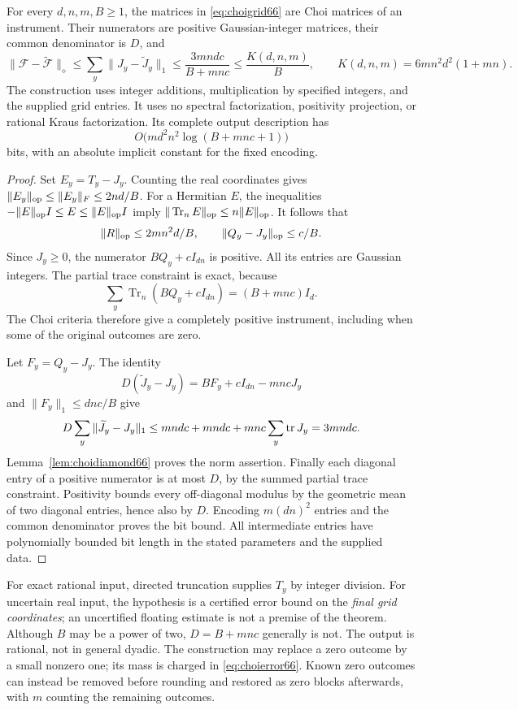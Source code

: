 \begin{theorem}\label{thm:choiround66}
For every $d,n,m,B\ge1$, the matrices in \eqref{eq:choigrid66} are
Choi matrices of an instrument. Their numerators are positive
Gaussian-integer matrices, their common denominator is $D$, and
\begin{equation}\label{eq:choierror66}
 \|\mathcal F-\widetilde{\mathcal F}\|_\diamond
 \le\sum_y\|J_y-\widetilde J_y\|_1
 \le\frac{3mndc}{B+mnc}\le\frac{K(d,n,m)}B,
 \qquad K(d,n,m)=6mn^2d^2(1+mn).
\end{equation}
The construction uses integer additions, multiplication by specified
integers, and the supplied grid entries. It uses no spectral
factorization, positivity projection, or rational Kraus
factorization. Its complete output description has
\[
 O\bigl(m d^2n^2\log(B+mnc+1)\bigr)
\]
bits, with an absolute implicit constant for the fixed encoding.
\end{theorem}
\begin{proof}
Set $E_y=T_y-J_y$. Counting the real coordinates gives
$\|E_y\|_{\rm op}\le\|E_y\|_F\le2nd/B$.
For a Hermitian $E$, the inequalities
$-\|E\|_{\rm op}I\le E\le\|E\|_{\rm op}I$ imply
$\|\operatorname{Tr}_{n}E\|_{\rm op}\le n\|E\|_{\rm op}$.
It follows that
\[
 \|R\|_{\rm op}\le2mn^2d/B,\qquad
             \|Q_y-J_y\|_{\rm op}\le c/B.
\]
Since $J_y\ge0$, the numerator $BQ_y+cI_{dn}$ is positive.
All its entries are Gaussian integers. The partial trace constraint is
exact, because
\[
 \sum_y\operatorname{Tr}_{n}(BQ_y+cI_{dn})
                       =(B+mnc)I_d.
\]
The Choi criteria therefore give a completely positive instrument,
including when some of the original outcomes are zero.

Let $F_y=Q_y-J_y$. The identity
\[
 D(\widetilde J_y-J_y)=BF_y+cI_{dn}-mncJ_y
\]
and $\|F_y\|_1\le dn c/B$ give
\[
 D\sum_y\|\widetilde J_y-J_y\|_1
 \le mndc+mndc+mnc\sum_y\operatorname{tr} J_y=3mndc.
\]
Lemma~\ref{lem:choidiamond66} proves the norm assertion. Finally each
diagonal entry of a positive numerator is at most $D$, by the summed
partial trace constraint. Positivity bounds every off-diagonal modulus
by the geometric mean of two diagonal entries, hence also by $D$.
Encoding $m(dn)^2$ entries and the common denominator proves the
bit bound. All intermediate entries have polynomially bounded bit
length in the stated parameters and the supplied data.
\end{proof}

For exact rational input, directed truncation supplies $T_y$ by integer
division. For uncertain real input, the hypothesis is a certified error
bound on the \emph{final grid coordinates}; an uncertified floating
estimate is not a premise of the theorem. Although $B$ may be a power
of two, $D=B+mnc$ generally is not. The output is rational, not in
general dyadic. The construction may replace a zero outcome by a
small nonzero one; its mass is charged in \eqref{eq:choierror66}.
Known zero outcomes can instead be removed before rounding and restored
as zero blocks afterwards, with $m$ counting the remaining outcomes.

